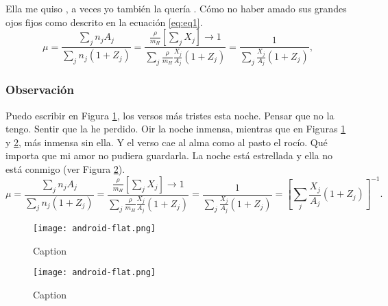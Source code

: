 Ella me quiso , a veces yo también la quería \citep[ejemplo][ja!]{lara2020}. Cómo no haber amado sus grandes ojos fijos como descrito en la ecuación \ref{eq:eq1}.
\begin{equation} 
\label{eq:eq1}
    \mu = \frac{\sum_j n_j A_j}{\sum_j n_j (1 + Z_j)} = \frac{\frac{\rho}{m_H} [\sum_j  X_j] \rightarrow 1}  {\sum_j \frac{\rho}{m_H} \frac{X_j}{A_j} (1 + Z_j)} = \frac{1}{\sum_j \frac{X_j}{A_j} (1+Z_j)},
\end{equation}

\subsubsection{Observación}

Puedo escribir en Figura \ref{fig:my_label1}, los versos más tristes esta noche. Pensar que no la tengo. Sentir que la he perdido. Oir la noche inmensa, mientras que en Figuras \ref{fig:my_label1} y \ref{fig:my_label2}, más inmensa sin ella. Y el verso cae al alma como al pasto el rocío. Qué importa que mi amor no pudiera guardarla. La noche está estrellada y ella no está conmigo (ver Figura \ref{fig:my_label2}).
\begin{equation*}
    \mu = \frac{\sum_j n_j A_j}{\sum_j n_j (1 + Z_j)} = \frac{\frac{\rho}{m_H} [\sum_j  X_j] \rightarrow 1}  {\sum_j \frac{\rho}{m_H} \frac{X_j}{A_j} (1 + Z_j)} = \frac{1}{\sum_j \frac{X_j}{A_j} (1+Z_j)} = \left[ \sum_j \frac{X_j}{A_j} (1+Z_j) \right]^{-1}.
\end{equation*}

\begin{figure}[htbp]
    \centering
    \texttt{[image: android-flat.png]}
    \caption{Caption}
    \label{fig:my_label1}
\end{figure}

\begin{figure}[htpb]
    \centering
    \texttt{[image: android-flat.png]}
    \caption{Caption}
    \label{fig:my_label2}
\end{figure}


\cleardoublepage